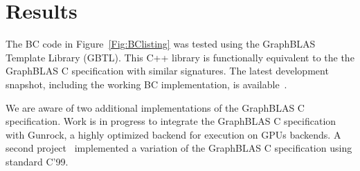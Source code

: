\section{Results}
\label{sec:results}

The BC code in Figure~\ref{Fig:BClisting} 
was tested using the GraphBLAS Template Library (GBTL)\cite{gbtl-cuda16}. This 
C++ library is functionally equivalent to the the GraphBLAS C
specification with similar signatures.  The latest development snapshot, 
including the working BC implementation, is available~\cite{gbtl-github}. 

We are aware of two additional implementations of the GraphBLAS C 
specification.  Work is in progress to integrate the GraphBLAS C specification 
with Gunrock\cite{topc17}, a highly optimized backend for execution 
on GPUs backends.  A second project~\cite{cook} implemented a variation
of the  GraphBLAS C specification using standard C'99.
